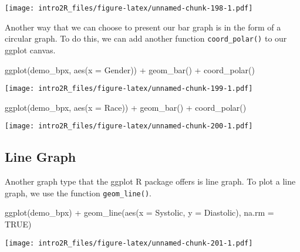 \documentclass[
]{book}
\newenvironment{Shaded}{\begin{snugshade}}{\end{snugshade}}
\newcommand{\AttributeTok}[1]{\textcolor[rgb]{0.77,0.63,0.00}{#1}}
\newcommand{\ConstantTok}[1]{\textcolor[rgb]{0.00,0.00,0.00}{#1}}
\newcommand{\FunctionTok}[1]{\textcolor[rgb]{0.00,0.00,0.00}{#1}}
\newcommand{\NormalTok}[1]{#1}
\newcommand{\SpecialCharTok}[1]{\textcolor[rgb]{0.00,0.00,0.00}{#1}}
\begin{document}
\texttt{[image: intro2R\_files/figure-latex/unnamed-chunk-198-1.pdf]}

Another way that we can choose to present our bar graph is in the form of a circular graph. To do this, we can add another function \texttt{coord\_polar()} to our ggplot canvas.

\begin{Shaded}
\begin{Highlighting}[]
\FunctionTok{ggplot}\NormalTok{(demo\_bpx, }\FunctionTok{aes}\NormalTok{(}\AttributeTok{x =}\NormalTok{ Gender)) }\SpecialCharTok{+}
  \FunctionTok{geom\_bar}\NormalTok{() }\SpecialCharTok{+}
  \FunctionTok{coord\_polar}\NormalTok{()}
\end{Highlighting}
\end{Shaded}

\texttt{[image: intro2R\_files/figure-latex/unnamed-chunk-199-1.pdf]}

\begin{Shaded}
\begin{Highlighting}[]
\FunctionTok{ggplot}\NormalTok{(demo\_bpx, }\FunctionTok{aes}\NormalTok{(}\AttributeTok{x =}\NormalTok{ Race)) }\SpecialCharTok{+}
  \FunctionTok{geom\_bar}\NormalTok{() }\SpecialCharTok{+}
  \FunctionTok{coord\_polar}\NormalTok{()}
\end{Highlighting}
\end{Shaded}

\texttt{[image: intro2R\_files/figure-latex/unnamed-chunk-200-1.pdf]}

\hypertarget{line-graph}{%
\subsection{Line Graph}\label{line-graph}}

Another graph type that the ggplot R package offers is line graph. To plot a line graph, we use the function \texttt{geom\_line()}.

\begin{Shaded}
\begin{Highlighting}[]
\FunctionTok{ggplot}\NormalTok{(demo\_bpx) }\SpecialCharTok{+} 
    \FunctionTok{geom\_line}\NormalTok{(}\FunctionTok{aes}\NormalTok{(}\AttributeTok{x =}\NormalTok{ Systolic, }\AttributeTok{y =}\NormalTok{ Diastolic), }\AttributeTok{na.rm =} \ConstantTok{TRUE}\NormalTok{)}
\end{Highlighting}
\end{Shaded}

\texttt{[image: intro2R\_files/figure-latex/unnamed-chunk-201-1.pdf]}
\end{document}
